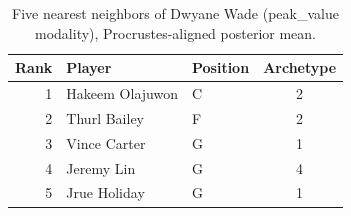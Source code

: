\begin{table}[htbp]
  \centering\small
  \begin{tabular}{rllc}
    \toprule
    Rank & Player & Position & Archetype \\
    \midrule
    1 & Hakeem Olajuwon & C & 2 \\
    2 & Thurl Bailey & F & 2 \\
    3 & Vince Carter & G & 1 \\
    4 & Jeremy Lin & G & 4 \\
    5 & Jrue Holiday & G & 1 \\
    \bottomrule
  \end{tabular}
  \caption{Five nearest neighbors of Dwyane Wade (peak_value modality), Procrustes-aligned posterior mean.}
  \label{tab:Dwyane_Wade_neighbors_peak_value}
\end{table}

